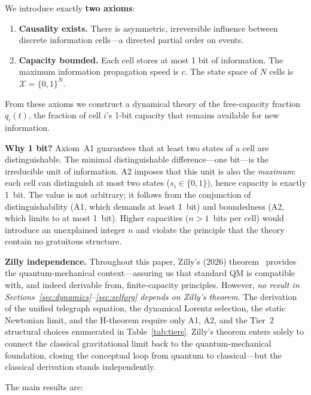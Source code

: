 \documentclass[aps,prd,twocolumn,showpacs,superscriptaddress,preprintnumbers]{revtex4-2}
\begin{document}
We introduce exactly \textbf{two axioms}:

\begin{enumerate}
    \item[A1.] \textbf{Causality exists.} There is asymmetric, irreversible influence between discrete information cells---a directed partial order on events.
    \item[A2.] \textbf{Capacity bounded.} Each cell stores at most 1 bit of information. The maximum information propagation speed is $c$. The state space of $N$ cells is $\mathcal{X}=\{0,1\}^N$.
\end{enumerate}

From these axioms we construct a dynamical theory of the free-capacity fraction $q_i(t)$, the fraction of cell $i$'s 1-bit capacity that remains available for new information.

\textbf{Why 1 bit?} Axiom~A1 guarantees that at least two states of a cell are distinguishable. The minimal distinguishable difference---one bit---is the irreducible unit of information.
A2 imposes that this unit is also the \emph{maximum}: each cell can distinguish at most two states ($s_i\in\{0,1\}$), hence capacity is exactly 1~bit.
The value is not arbitrary; it follows from the conjunction of distinguishability (A1, which demands at least 1~bit) and boundedness (A2, which limits to at most 1~bit).
Higher capacities ($n>1$~bits per cell) would introduce an unexplained integer $n$ and violate the principle that the theory contain no gratuitous structure.

\textbf{Zilly independence.} Throughout this paper, Zilly's (2026) theorem~\cite{Zilly:2026} provides the quantum-mechanical context---assuring us that standard QM is compatible with, and indeed derivable from, finite-capacity principles.
However, \emph{no result in Sections~\ref{sec:dynamics}--\ref{sec:selforg} depends on Zilly's theorem.}
The derivation of the unified telegraph equation, the dynamical Lorentz selection, the static Newtonian limit, and the H-theorem require only A1, A2, and the Tier~2 structural choices enumerated in Table~\ref{tab:tiers}.
Zilly's theorem enters solely to connect the classical gravitational limit back to the quantum-mechanical foundation, closing the conceptual loop from quantum to classical---but the classical derivation stands independently.

The main results are:
\end{document}
